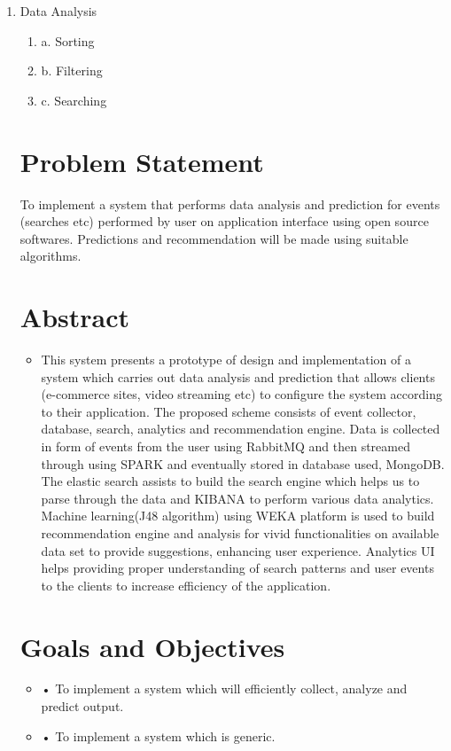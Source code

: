 \documentclass[oneside,a4paper,12pt]{book}
\begin{document}
\begin{enumerate}
	\item 	Data Analysis  
	\begin{enumerate}
		\item a.	Sorting
		\item b.	Filtering
		\item c.	Searching
		
		
	 		\end{enumerate} 
		



\section{Problem Statement}
\label{sec:problem}
        To implement a system that performs data analysis and prediction for events (searches etc) performed by user on application interface using open source softwares. Predictions and recommendation will be made using suitable algorithms.
\section{Abstract}
\begin{itemize}
	\item This system presents a prototype of design and implementation of a system which carries out data analysis and prediction that allows clients (e-commerce sites, video streaming etc) to configure the system according to their application. The proposed scheme consists of event collector, database, search, analytics and recommendation engine. Data is collected in form of events from the user using RabbitMQ and then streamed through using SPARK and eventually stored in database used, MongoDB. The elastic search assists to build the search engine which helps us to parse through the data and KIBANA to perform various data analytics. Machine learning(J48 algorithm) using WEKA platform is used to build recommendation engine and analysis for vivid functionalities on available data set to provide suggestions, enhancing user experience. Analytics UI helps providing proper understanding of search patterns and user events to the clients to increase efficiency of the application.
\end{itemize}

\section{Goals and Objectives}
\begin{itemize}
	\item •	To implement a system which will efficiently collect, analyze and predict output.
	\item •	To implement a system which is generic. 
\end{itemize}


\end{enumerate}
\end{document}
